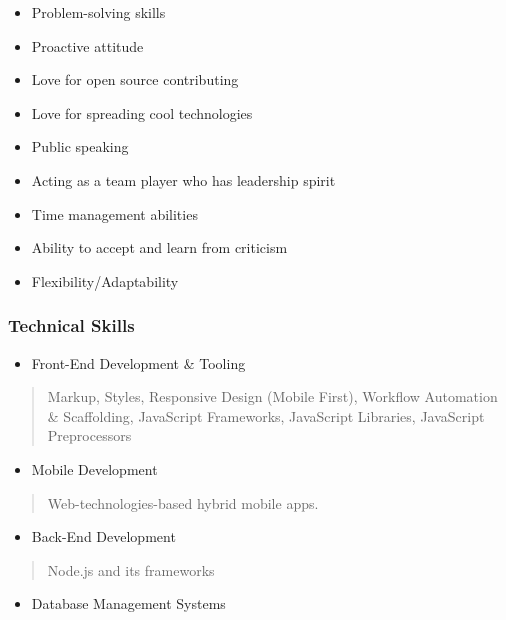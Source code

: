 \documentclass[]{article}
\providecommand{\tightlist}{%
  \setlength{\itemsep}{0pt}\setlength{\parskip}{0pt}}
\begin{document}
\begin{itemize}
\tightlist
\item
  Problem-solving skills
\item
  Proactive attitude
\item
  Love for open source contributing
\item
  Love for spreading cool technologies
\item
  Public speaking
\item
  Acting as a team player who has leadership spirit
\item
  Time management abilities
\item
  Ability to accept and learn from criticism
\item
  Flexibility/Adaptability
\end{itemize}

\subsubsection{Technical Skills}\label{technical-skills}

\begin{itemize}
\tightlist
\item
  Front-End Development \& Tooling
\end{itemize}

\begin{quote}
Markup, Styles, Responsive Design (Mobile First), Workflow Automation \&
Scaffolding, JavaScript Frameworks, JavaScript Libraries, JavaScript
Preprocessors
\end{quote}

\begin{itemize}
\tightlist
\item
  Mobile Development
\end{itemize}

\begin{quote}
Web-technologies-based hybrid mobile apps.
\end{quote}

\begin{itemize}
\tightlist
\item
  Back-End Development
\end{itemize}

\begin{quote}
Node.js and its frameworks
\end{quote}

\begin{itemize}
\tightlist
\item
  Database Management Systems
\end{itemize}
\end{document}
